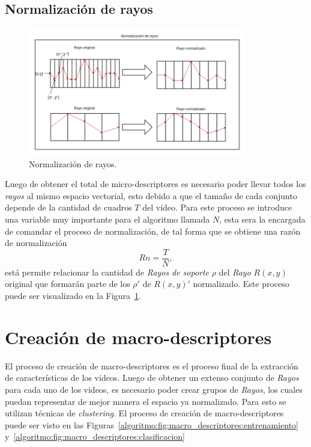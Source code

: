 	\subsection{Normalización de rayos}
		\begin{figure}[bt]
			\centering
			\includegraphics[width=0.85\textwidth]{Figuras/Diagramas/normalizacion_de_rayos.png}
			\caption{Normalización de rayos.}
			\label{algoritmo:fig:normalizacion}
		\end{figure}
	\label{algoritmo:normalizacion}
	Luego de obtener el total de micro-descriptores es necesario poder llevar todos los \textit{rayos} al mismo espacio vectorial, esto debido a que el tamaño de cada conjunto depende de la cantidad de cuadros $T$ del vídeo. Para este proceso se introduce una variable muy importante para el algoritmo llamada $N$, esta sera la encargada de comandar el proceso de normalización, de tal forma que se obtiene una razón de normalización
	\begin{equation}
		Rn = \frac{T}{N},
	\end{equation}
	está permite relacionar la cantidad de \textit{Rayos de soporte} $\rho$ del \textit{Rayo} $R(x,y)$ original que formarán parte de los $\rho'$ de $R(x,y)'$ normalizado. Este proceso puede ser visualizado en la Figura~\ref{algoritmo:fig:normalizacion}.
	

		
\section{Creación de macro-descriptores}
\label{sec:macro-descriptores}
El proceso de creación de macro-descriptores es el proceso final de la extracción de características de los videos. Luego de obtener un extenso conjunto de \textit{Rayos} para cada uno de los videos, es necesario poder crear grupos de \textit{Rayos}, los cuales puedan representar de mejor manera el espacio ya normalizado. Para esto se utilizan técnicas de \textit{clustering}. El proceso de creación de macro-descriptores puede ser visto en las Figuras~\ref{algoritmo:fig:macro_descriptores:entrenamiento} y~\ref{algoritmo:fig:macro_descriptores:clasificacion}

